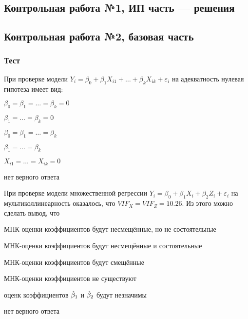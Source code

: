 \subsection{Контрольная работа №1, ИП часть — решения}



\subsection{Контрольная работа №2, базовая часть}


\subsubsection*{Тест}

\begin{question}
При проверке модели $Y_i = \beta_0 + \beta_1 X_{i1} + \ldots + \beta_k X_{ik} + \varepsilon_i$ на адекватность нулевая гипотеза имеет вид:
\begin{answerlist}
  \item $\beta_0 = \beta_1 = \ldots = \beta_k = 0$
  \item $\beta_1 = \ldots = \beta_k = 0$
  \item $\beta_0 = \beta_1 = \ldots = \beta_k $
  \item $\beta_1 = \ldots = \beta_k $
  \item $X_{i1} = \ldots = X_{ik} = 0$
  \item нет верного ответа
\end{answerlist}
\end{question}

\begin{question}
При проверке модели множественной регрессии $Y_i = \beta_0 + \beta_1 X_i + \beta_2 Z_i + \varepsilon_i$ на мультиколлинеарность оказалось, что $VIF_X = VIF_Z = 10.26$. Из этого можно сделать вывод, что 
\begin{answerlist}[2]
  \item МНК-оценки коэффициентов будут несмещённые, но не состоятельные
  \item МНК-оценки коэффициентов будут несмещённые и состоятельные
  \item МНК-оценки коэффициентов будут смещённые
  \item МНК-оценки коэффициентов не существуют
  \item оценк коэффициентов $\hat{\beta}_1$ и $\hat{\beta}_2$ будут незначимы
  \item нет верного ответа
\end{answerlist}
\end{question}


